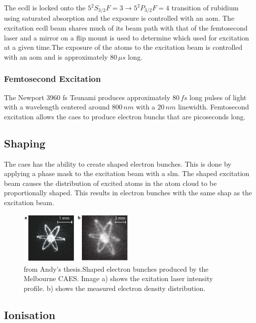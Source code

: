 The \gls{ecdl} is locked onto the $5 ^2 S_{3/2} F=3\rightarrow5 ^2 P_{3/2} F=4$ transition of rubidium using saturated absorption and the exposure is controlled with an \gls{aom}. The excitation \gls{ecdl} beam shares much of its beam path with that of the femtosecond laser and a mirror on a flip mount is used to determine which used for excitation at a given time.The exposure of the atoms to the excitation beam is controlled with an \gls{aom} and is approximately $80\,\unit{\mu s}$ long.

\subsubsection{Femtosecond Excitation}

The Newport 3960 fs Tsunami produces approximately $80\,\unit{fs}$ long pulses of light with a wavelength centered around $800\,\unit{nm}$ with a $20\,\unit{nm}$ linewidth.\cite{mcculloch_towards_2012} Femtosecond excitation allows the \gls{caes} to produce electron bunchs that are picoseconds long.

\subsection{Shaping}

The \gls{caes} has the ability to create shaped electron bunches. This is done by applying a phase mask to the excitation beam with a \gls{slm}. The shaped excitation beam causes the distribution of excited atoms in the atom cloud to be proportionally shaped. This results in electron bunches with the same shap as the excitation beam.

\begin{figure}[h]
\centering
\includegraphics[width=0.5\textwidth]{figs/atom_electrons.pdf}
\caption{{\color{red}from Andy's thesis.}Shaped electron bunches produced by the Melbourne CAES. Image a) shows the exitation laser intensity profile. b) shows the measured electron density distribution.}
\end{figure}

\subsection{Ionisation}




